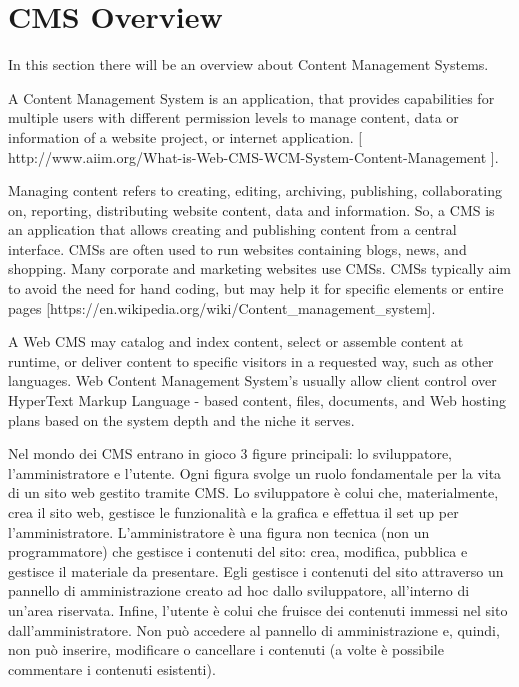 \section{CMS Overview}
\label{sec:CMS_overview}

In this section there will be an overview about Content Management Systems.

A Content Management System is an application, that provides capabilities for multiple users with different permission levels to manage content, data or information of a website project, or internet application. [ http://www.aiim.org/What-is-Web-CMS-WCM-System-Content-Management ].

Managing content refers to creating, editing, archiving, publishing, collaborating on, reporting, distributing website content, data and information.
So, a CMS is an application that allows creating and publishing content from a central interface. CMSs are often used to run websites containing blogs, news, and shopping. Many corporate and marketing websites use CMSs. CMSs typically aim to avoid the need for hand coding, but may help it for specific elements or entire pages [https://en.wikipedia.org/wiki/Content_management_system]. 

A Web CMS may catalog and index content, select or assemble content at runtime, or deliver content to specific visitors in a requested way, such as other languages. Web Content Management System's usually allow client control over HyperText Markup Language - based content, files, documents, and Web hosting plans based on the system depth and the niche it serves.

Nel mondo dei CMS entrano in gioco 3 figure principali: lo sviluppatore, l’amministratore e l’utente. Ogni figura svolge un ruolo fondamentale per la vita di un sito web gestito tramite CMS.
Lo sviluppatore è colui che, materialmente, crea il sito web, gestisce le funzionalità e la grafica e effettua il set up per l’amministratore.
L’amministratore è una figura non tecnica (non un programmatore) che gestisce i contenuti del sito: crea, modifica, pubblica e gestisce il materiale da presentare. Egli gestisce i contenuti del sito attraverso un pannello di amministrazione creato ad hoc dallo sviluppatore, all’interno di un’area riservata.
Infine, l’utente è colui che fruisce dei contenuti immessi nel sito dall’amministratore. Non può accedere al pannello di amministrazione e, quindi, non può inserire, modificare o cancellare i contenuti (a volte è possibile commentare i contenuti esistenti).

